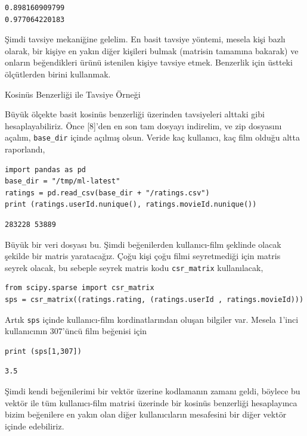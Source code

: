 \documentclass[12pt,fleqn]{article}\usepackage{../../common}
\begin{document}
\begin{verbatim}
0.898160909799
0.977064220183
\end{verbatim}

Şimdi tavsiye mekaniğine gelelim. En basit tavsiye yöntemi, mesela
kişi bazlı olarak, bir kişiye en yakın diğer kişileri bulmak (matrisin
tamamına bakarak) ve onların beğendikleri ürünü istenilen kişiye
tavsiye etmek. Benzerlik için üstteki ölçütlerden birini kullanmak.

Kosinüs Benzerliği ile Tavsiye Örneği

Büyük ölçekte basit kosinüs benzerliği üzerinden tavsiyeleri alttaki gibi
hesaplayabiliriz. Önce [8]'den en son tam dosyayı indirelim, ve zip dosyasını
açalım, \verb!base_dir! içinde açılmış olsun. Veride kaç kullanıcı, kaç film
olduğu altta raporlandı,

\begin{verbatim}
import pandas as pd
base_dir = "/tmp/ml-latest"
ratings = pd.read_csv(base_dir + "/ratings.csv")
print (ratings.userId.nunique(), ratings.movieId.nunique())
\end{verbatim}

\begin{verbatim}
283228 53889
\end{verbatim}

Büyük bir veri dosyası bu. Şimdi beğenilerden kullanıcı-film şeklinde olacak
şekilde bir matris yaratacağız. Çoğu kişi çoğu filmi seyretmediği için matris
seyrek olacak, bu sebeple seyrek matris kodu \verb!csr_matrix! kullanılacak, 

\begin{verbatim}
from scipy.sparse import csr_matrix
sps = csr_matrix((ratings.rating, (ratings.userId , ratings.movieId)))
\end{verbatim}

Artık \verb!sps! içinde kullanıcı-film kordinatlarından oluşan bilgiler
var. Mesela 1'inci kullanıcının 307'üncü film beğenisi için

\begin{verbatim}
print (sps[1,307])
\end{verbatim}

\begin{verbatim}
3.5
\end{verbatim}

Şimdi kendi beğenilerimi bir vektör üzerine kodlamanın zamanı geldi, böylece bu
vektör ile tüm kullanıcı-film matrisi üzerinde bir kosinüs benzerliği
hesaplayınca bizim beğenilere en yakın olan diğer kullanıcıların mesafesini bir
diğer vektör içinde edebiliriz.
\end{document}
